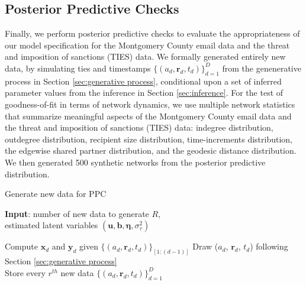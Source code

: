 \documentclass[12pt]{article}
\begin{document}
\subsection{Posterior Predictive Checks}\label{subsubsec:PPC_email} 	   
Finally, we perform posterior predictive checks \cite{rubin1984bayesianly} to evaluate the appropriateness of our model specification for the Montgomery County email data and the threat and imposition of sanctions (TIES) data. We formally generated entirely new data, by simulating ties and timestamps $\{(a_{d}, \boldsymbol{r}_{d}, t_{d})\}_{d=1}^D$ from the genenerative process in Section \ref{sec:generative process}, conditional upon a set of inferred parameter values from the inference in Section \ref{sec:inference}. For the test of goodness-of-fit in terms of network dynamics, we use multiple network statistics that summarize meaningful aspects of the Montgomery County email data and the threat and imposition of sanctions (TIES) data: indegree distribution, outdegree distribution, recipient size distribution, time-increments distribution, the edgewise shared partner distribution, and the geodesic distance distribution. We then generated 500 synthetic networks from the posterior predictive distribution.
\begin{algorithm}[H]
	\caption{Generate new data for PPC}
	\begin{algorithmic}
		\STATE \textbf{Input}: number of new data to generate $R$,\\
		estimated latent variables $(\boldsymbol{u}, \boldsymbol{b}, \boldsymbol{\eta},  \sigma_\tau^2)$\\
		\vskip 0.1in
		
		\STATE  Compute $\boldsymbol{x}_{d}$ and $\boldsymbol{y}_{d}$ given $\{(a_{d}, \boldsymbol{r}_{d}, t_{d})\}_{[1:(d-1)]}$
		\STATE	Draw ($a_{d}$, $\boldsymbol{r}_{d}$, $t_{d}$) following Section \ref{sec:generative process}\\
		\ENDFOR
		\STATE Store every $r^{th}$ new data $\{(a_{d}, \boldsymbol{r}_{d}, t_{d})\}_{d=1}^D$ 
		\ENDFOR
	\end{algorithmic}
\end{algorithm}       
\end{document}
